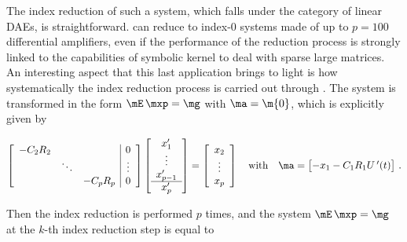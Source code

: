 The index reduction of such a system, which falls under the category of linear \acp{DAE}, is straightforward. \Indigo{} can reduce to index-0 systems made of up to $p = 100$ differential amplifiers, even if the performance of the reduction process is strongly linked to the capabilities of \Maple{} symbolic kernel to deal with sparse large matrices. An interesting aspect that this last application brings to light is how systematically the index reduction process is carried out through \Indigo{}. The system is transformed in the form $\mE \, \mxp = \mg$ with $\ma = \m{0}$, which is explicitly given by
%
\begin{small}
  \begin{equation*}
    \left[\begin{array}{ccc|c}
      -C_2 R_2 & & & 0 \\
      & \ddots & & \vdots \\
      & & -C_p R_p & 0
    \end{array}\right]
    \left[\begin{array}{c}
      x_1^{\prime} \\ \vdots \\ x_{p-1}^{\prime} \\ \hline x_p^{\prime}
    \end{array}\right] = \left[\begin{array}{c}
      x_2 \\ \vdots \\ x_p
    \end{array}\right]
    \quad \text{with} \quad
    \ma = \begin{bmatrix}
      - x_1 - C_1 R_1 U{\,}^{\prime}(t)
    \end{bmatrix} \, \text{.}
  \end{equation*}
\end{small}
%
Then the index reduction is performed $p$ times, and the system $\mE \, \mxp = \mg$ at the $k$-th index reduction step is equal to
%

